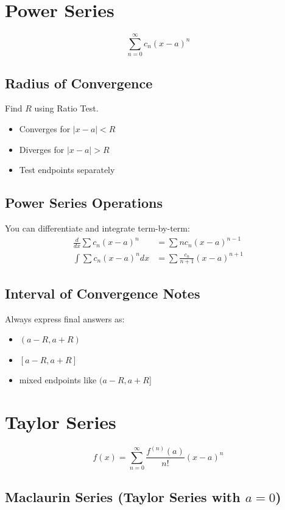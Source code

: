 \documentclass[11pt]{article}
\theoremstyle{mydef}
\begin{document}
\section*{Power Series}

\[
\sum_{n=0}^{\infty} c_n(x-a)^n
\]
\subsection*{Radius of Convergence}
Find $R$ using Ratio Test.

\begin{itemize}
\item Converges for $|x-a|<R$
\item Diverges for $|x-a|>R$
\item Test endpoints separately
\end{itemize}
\subsection*{Power Series Operations}
You can differentiate and integrate term-by-term:
\begin{align*}
\frac{d}{dx}\sum c_n(x-a)^n &= \sum n c_n (x-a)^{n-1} \\
\int \sum c_n(x-a)^n dx &= \sum \frac{c_n}{n+1}(x-a)^{n+1}
\end{align*}

\subsection*{Interval of Convergence Notes}
Always express final answers as:
\begin{itemize}
\item $(a-R, a+R)$
\item $[a-R, a+R]$
\item mixed endpoints like $(a-R, a+R]$
\end{itemize}
\section*{Taylor Series}

\[
f(x)=\sum_{n=0}^{\infty}
\frac{f^{(n)}(a)}{n!}(x-a)^n
\]

\subsection*{Maclaurin Series (Taylor Series with $a=0$)}
\end{document}
